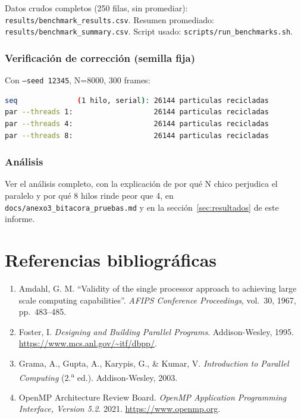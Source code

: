 \documentclass[12pt,letterpaper]{article}
\begin{document}
Datos crudos completos (250 filas, sin promediar):
\texttt{results/benchmark\_results.csv}. Resumen promediado:
\texttt{results/benchmark\_summary.csv}. Script usado:
\texttt{scripts/run\_benchmarks.sh}.

\subsubsection*{Verificación de corrección (semilla fija)}

Con \texttt{--seed 12345}, N=8000, 300 frames:

\begin{lstlisting}[language=bash,caption={Verificación: mismo resultado de simulación en todos los binarios/hilos}]
seq              (1 hilo, serial): 26144 particulas recicladas
par --threads 1:                   26144 particulas recicladas
par --threads 4:                   26144 particulas recicladas
par --threads 8:                   26144 particulas recicladas
\end{lstlisting}

\subsubsection*{Análisis}

Ver el análisis completo, con la explicación de por qué N chico perjudica
el paralelo y por qué 8 hilos rinde peor que 4, en
\texttt{docs/anexo3\_bitacora\_pruebas.md} y en la
sección~\ref{sec:resultados} de este informe.

\newpage
\section*{Referencias bibliográficas}

\begin{enumerate}
\item Amdahl, G. M. ``Validity of the single processor approach to
achieving large scale computing capabilities''. \emph{AFIPS Conference
Proceedings}, vol.\ 30, 1967, pp.\ 483--485.
\item Foster, I. \emph{Designing and Building Parallel Programs}.
Addison-Wesley, 1995. \url{https://www.mcs.anl.gov/~itf/dbpp/}.
\item Grama, A., Gupta, A., Karypis, G., \& Kumar, V. \emph{Introduction
to Parallel Computing} (2.\textsuperscript{a} ed.). Addison-Wesley,
2003.
\item OpenMP Architecture Review Board. \emph{OpenMP Application
Programming Interface, Version 5.2}. 2021.
\url{https://www.openmp.org}.
\end{enumerate}
\end{document}
